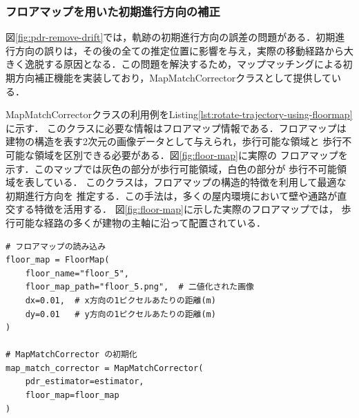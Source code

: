 

\subsubsection{フロアマップを用いた初期進行方向の補正}

図\ref{fig:pdr-remove-drift}では，軌跡の初期進行方向の誤差の問題がある．初期進行方向の誤りは，その後の全ての推定位置に影響を与え，実際の移動経路から大きく逸脱する原因となる．この問題を解決するため，マップマッチングによる初期方向補正機能を実装しており，MapMatchCorrectorクラスとして提供している．

MapMatchCorrectorクラスの利用例をListing\ref{lst:rotate-trajectory-using-floormap}に示す．
このクラスに必要な情報はフロアマップ情報である．フロアマップは
建物の構造を表す2次元の画像データとして与えられ，歩行可能な領域と
歩行不可能な領域を区別できる必要がある．図\ref{fig:floor-map}に実際の
フロアマップを示す．このマップでは灰色の部分が歩行可能領域，白色の部分が
歩行不可能領域を表している．
このクラスは，フロアマップの構造的特徴を利用して最適な初期進行方向を
推定する．この手法は，多くの屋内環境において壁や通路が直交する特徴を活用する．
図\ref{fig:floor-map}に示した実際のフロアマップでは，
歩行可能な経路の多くが建物の主軸に沿って配置されている．

\begin{lstlisting}[caption={MapMatchCorrectorの使用例},label=lst:rotate-trajectory-using-floormap,float=ht]
# フロアマップの読み込み
floor_map = FloorMap(
    floor_name="floor_5",
    floor_map_path="floor_5.png",  # 二値化された画像
    dx=0.01,  # x方向の1ピクセルあたりの距離(m)
    dy=0.01   # y方向の1ピクセルあたりの距離(m)
)

# MapMatchCorrector の初期化
map_match_corrector = MapMatchCorrector(
    pdr_estimator=estimator,
    floor_map=floor_map
)
\end{lstlisting}


